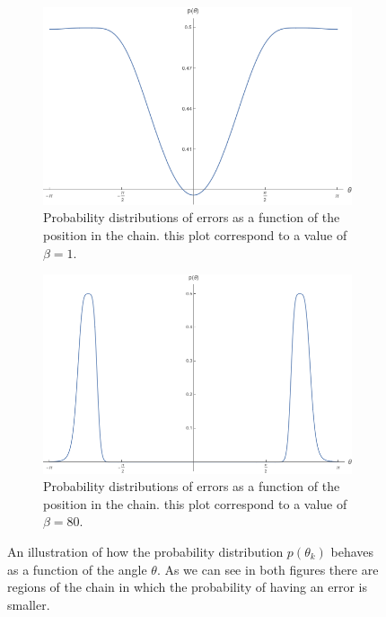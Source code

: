 \begin{figure}[H]
\centering
\begin{subfigure}[b]{0.47\textwidth}
    \centering
    \includegraphics[width = \textwidth]{Figures/beta_1.png}
    \caption{Probability distributions of errors as a function of the position in the chain. this plot correspond to a value of $\beta=1$.}
    \label{beta1}
\end{subfigure}
\hfill
\begin{subfigure}[b]{0.47\textwidth}
    \centering
    \includegraphics[width = \textwidth]{Figures/beta_80.png}
    \caption{Probability distributions of errors as a function of the position in the chain. this plot correspond to a value of $\beta=80$.}
    \label{beta80}
\end{subfigure}
\caption{An illustration of how the probability distribution $p(\theta_k)$ behaves as a function of the angle $\theta$. As we can see in both figures there are regions of the chain in which the probability of having an error is smaller.}
       \label{CH3:examples_of_probability_distribution_errors}
\end{figure}


